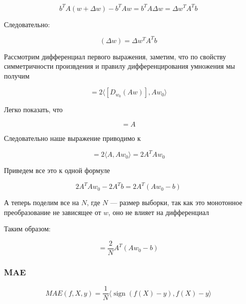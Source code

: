 \documentclass{article}
\begin{document}
    \begin{equation}
        b^{T} A (w + \Delta w) - b^{T} A w = b^{T} A \Delta w = \Delta w^{T}  A^{T} b
    \end{equation}

    Следовательно: 

    \begin{equation}
        [D_{w_{0}} (\langle Aw, b  \rangle)](\Delta w) = \Delta w^{T} A^{T} b
    \end{equation}

    Рассмотрим дифференциал первого выражения, заметим, что по свойству симметричности произвдения и правилу дифференцирования умножения мы получим

    \begin{equation}
        [D_{w_{0}} (\langle Aw, Aw  \rangle)] = 2 \langle[D_{w_{0}} (Aw)], Aw_{0}  \rangle
    \end{equation}

    Легко показать, что 

    \begin{equation}
        [D_{w_{0}} (Aw)] = A 
    \end{equation}

    Следовательно наше выражение приводимо к

    \begin{equation}
        [D_{w_{0}} (\langle Aw, Aw  \rangle)] = 2 \langle A, Aw_{0}  \rangle = 2 A^{T}Aw_{0}
    \end{equation}

    Приведем все это к одной формуле 

    \begin{equation}
        2 A^{T}A w_{0} - 2  A^{T} b = 2 A^{T} (A w_{0} - b)
    \end{equation}

    А теперь поделим все на $N$, где $N$ --- размер выборки, так как это монотонное преобразование не зависящее от $w$, оно не влияет на дифференциал
    
    Таким образом: 

    \begin{equation}
        [D_{w_{0}} (MSE)] = \frac{2}{N} A^{T} (A w_{0} - b)
    \end{equation}

    \subsubsection{MAE}

    \begin{equation}
        MAE(f, X, y) = \frac{1}{N} \langle \operatorname{sign}(f(X) - y), f(X) - y \rangle
    \end{equation}
\end{document}
